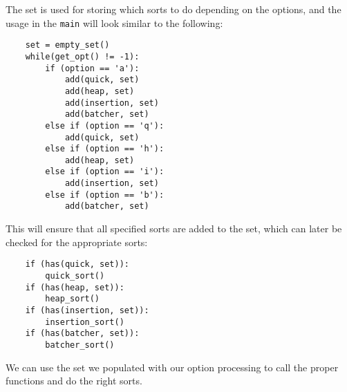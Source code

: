 \documentclass[12pt]{article}
\begin{document}
The set is used for storing which sorts to do depending on the options, and the usage in the \verb|main| will look similar to the following:
\begin{verbatim}
    set = empty_set()
    while(get_opt() != -1):
        if (option == 'a'):
            add(quick, set)
            add(heap, set)
            add(insertion, set)
            add(batcher, set)
        else if (option == 'q'):
            add(quick, set)
        else if (option == 'h'):
            add(heap, set)
        else if (option == 'i'):
            add(insertion, set)
        else if (option == 'b'):
            add(batcher, set)
\end{verbatim}
This will ensure that all specified sorts are added to the set, which can later be checked for the appropriate sorts:
\begin{verbatim}
    if (has(quick, set)):
        quick_sort()
    if (has(heap, set)):
        heap_sort()
    if (has(insertion, set)):
        insertion_sort()
    if (has(batcher, set)):
        batcher_sort()
\end{verbatim}
We can use the set we populated with our option processing to call the proper functions and do the right sorts.
\end{document}
